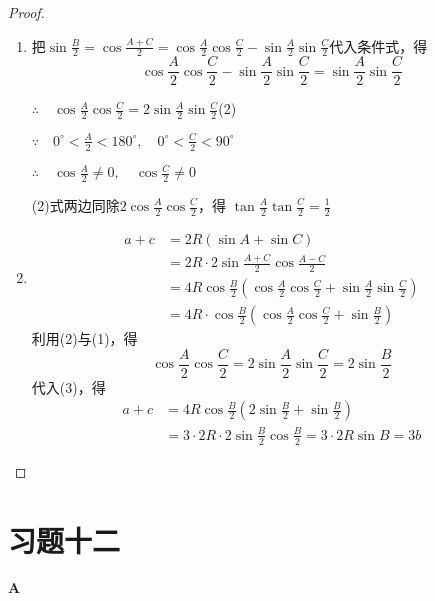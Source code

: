 \begin{proof}
\begin{enumerate}[(1)]
    \item 把$\sin\frac{B}{2}=\cos\frac{A+C}{2}=\cos\frac{A}{2}\cos\frac{C}{2}-\sin\frac{A}{2}\sin\frac{C}{2}$代入条件式，得
\[\cos\frac{A}{2}\cos\frac{C}{2}-\sin\frac{A}{2}\sin\frac{C}{2}=\sin\frac{A}{2}\sin\frac{C}{2}\]

$\therefore\quad \cos\frac{A}{2}\cos\frac{C}{2}=2\sin\frac{A}{2}\sin\frac{C}{2}$\hfill(2)

$\because\quad 0^{\circ}<\frac{A}{2}<180^{\circ},\quad 0^{\circ}<\frac{C}{2}<90^{\circ}$

$\therefore\quad \cos\frac{A}{2}\ne 0,\quad \cos\frac{C}{2}\ne 0$

(2)式两边同除$2\cos\frac{A}{2}\cos\frac{C}{2}$，得 $\tan\frac{A}{2}\tan\frac{C}{2}=\frac{1}{2}$

\item \begin{align}
    a+c&=2R(\sin A+\sin C)\nonumber\\
    &=2R\cdot 2\sin\frac{A+C}{2}\cos\frac{A-C}{2} \tag{目标是化出$3b$}\\
&=4R\cos\frac{B}{2}\left(\cos\frac{A}{2}\cos\frac{C}{2}+\sin\frac{A}{2}\sin\frac{C}{2}\right)\nonumber\\
&=4R\cdot \cos\frac{B}{2}\left(\cos\frac{A}{2}\cos\frac{C}{2}+\sin\frac{B}{2}\right)\tag{3}
\end{align}
利用(2)与(1)，得
\[\cos\frac{A}{2}\cos\frac{C}{2}=2\sin\frac{A}{2}\sin\frac{C}{2}=2\sin\frac{B}{2}\]
代入(3)，得
\[\begin{split}
    a+c&=4R\cos\frac{B}{2}\left(2\sin\frac{B}{2}+\sin\frac{B}{2}\right)\\
    &=3\cdot 2R\cdot 2\sin\frac{B}{2}\cos\frac{B}{2}=3\cdot 2R\sin B=3b
\end{split}\]
\end{enumerate}
\end{proof}

\section*{习题十二}
\begin{center}
    \bfseries A
\end{center}

